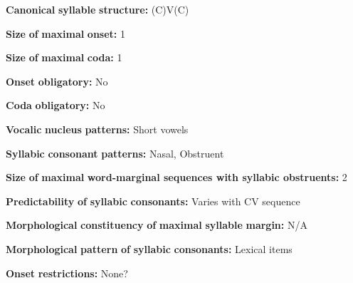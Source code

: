 \documentclass[output=paper]{langsci/langscibook}
\begin{document}
\begin{styleBody}
\textbf{Canonical} \textbf{syllable} \textbf{structure:} (C)V(C) \citep[31-34]{Chang2006}
\end{styleBody}

\begin{styleBody}
\textbf{Size} \textbf{of} \textbf{maximal} \textbf{onset:} 1
\end{styleBody}

\begin{styleBody}
\textbf{Size} \textbf{of} \textbf{maximal} \textbf{coda:} 1
\end{styleBody}

\begin{styleBody}
\textbf{Onset} \textbf{obligatory:} No
\end{styleBody}

\begin{styleBody}
\textbf{Coda} \textbf{obligatory:} No
\end{styleBody}

\begin{styleBody}
\textbf{Vocalic} \textbf{nucleus} \textbf{patterns:} Short vowels
\end{styleBody}

\begin{styleBody}
\textbf{Syllabic} \textbf{consonant} \textbf{patterns:} Nasal, Obstruent
\end{styleBody}

\begin{styleBody}
\textbf{Size} \textbf{of} \textbf{maximal} \textbf{word{}-marginal sequences with syllabic obstruents:} 2
\end{styleBody}

\begin{styleBody}
\textbf{Predictability} \textbf{of} \textbf{syllabic} \textbf{consonants:} Varies with CV sequence
\end{styleBody}

\begin{styleBody}
\textbf{Morphological} \textbf{constituency} \textbf{of} \textbf{maximal} \textbf{syllable} \textbf{margin:} N/A
\end{styleBody}

\begin{styleBody}
\textbf{Morphological} \textbf{pattern} \textbf{of} \textbf{syllabic} \textbf{consonants:} Lexical items
\end{styleBody}

\begin{styleBody}
\textbf{Onset} \textbf{restrictions:} None?
\end{styleBody}
\end{document}
